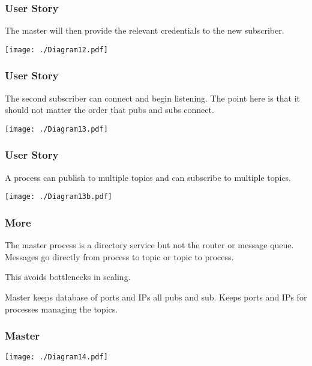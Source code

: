 \documentclass[xcolor=svgnames]{beamer}
\begin{document}
\begin{frame}[fragile]
  \frametitle{User Story}
  The master will then provide the relevant credentials to the new 
  subscriber.
\begin{center}
\texttt{[image: ./Diagram12.pdf]}
\end{center}
\end{frame}




\begin{frame}[fragile]
  \frametitle{User Story}
  
  The second subscriber can connect and begin listening.   The point here
 is that it should not matter the order that pubs and subs connect.
\begin{center}
\texttt{[image: ./Diagram13.pdf]}
\end{center}
\end{frame}



\begin{frame}[fragile]
  \frametitle{User Story}
  
A process can publish to multiple topics and can subscribe to multiple 
topics.
\begin{center}
\texttt{[image: ./Diagram13b.pdf]}
\end{center}
\end{frame}


\begin{frame}[fragile]
  \frametitle{More}


The master process is a directory service but not the router or message 
queue.  Messages go directly from process to topic or topic to process.
\vfill


This avoids bottlenecks in scaling.\vfill

Master keeps database of ports and IPs all pubs and sub.   Keeps 
ports and IPs for processes managing the topics.


\end{frame}


\begin{frame}[fragile]
  \frametitle{Master}
\begin{center}
\texttt{[image: ./Diagram14.pdf]}
\end{center}
\end{frame}
\end{document}
